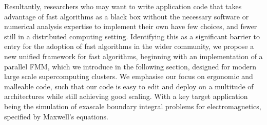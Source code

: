 Resultantly, researchers who may want to write application code that takes advantage of fast algorithms as a black box without the necessary software or numerical analysis expertise to implement their own have few choices, and fewer still in a distributed computing setting. Identifying this as a significant barrier to entry for the adoption of fast algorithms in the wider community, we propose a new unified framework for fast algorithms, beginning with an implementation of a parallel FMM, which we introduce in the following section, designed for modern large scale supercomputing clusters. We emphasise our focus on ergonomic and malleable code, such that our code is easy to edit and deploy on a multitude of architectures while still achieving good scaling. With a key target application being the simulation of exascale boundary integral problems for electromagnetics, specified by Maxwell's equations.
